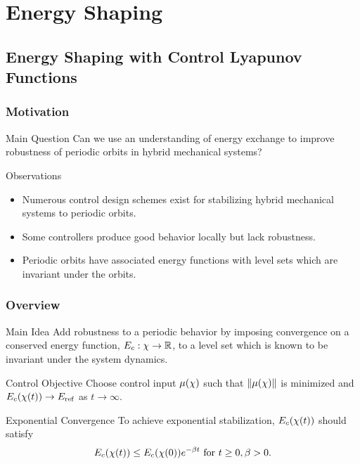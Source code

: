 \section{Energy Shaping}
\showtoc

\subsection{Energy Shaping with Control Lyapunov Functions}

\begin{frame}[t]
  \frametitle{Motivation}
  \begin{block}{Main Question}
    Can we use an understanding of energy exchange to improve robustness  of
    periodic orbits in hybrid mechanical systems?
  \end{block}

  \begin{block}{Observations}
    \begin{itemize}
    \item Numerous control design schemes exist for stabilizing hybrid mechanical
      systems to periodic orbits.
    \item Some controllers produce good behavior locally but lack robustness.
    \item Periodic orbits have associated energy functions with level sets which
      are invariant under the orbits.
    \end{itemize}
  \end{block}
\end{frame}

\begin{frame}[t]
  \frametitle{Overview}
  \begin{block}{Main Idea}
    Add robustness to a periodic behavior by imposing convergence on a conserved
    energy function, $E_{c} : \chi \to \mathbb{R}$, to a level set which is known to be
    invariant under the system dynamics.
  \end{block}
  
  \begin{block}{Control Objective}
    Choose control input $\mu(\chi)$ such that $\| \mu(\chi) \|$ is minimized and
    $E_{c}(\chi(t)) \to E_{\mathrm{ref}}$ as $t \to \infty$.
  \end{block}

  \begin{block}{Exponential Convergence}
    To achieve exponential stabilization, $E_{c}(\chi(t))$ should satisfy\vspace{-.4em}
    \begin{align*}
      E_{c}(\chi(t)) \leq E_{c}(\chi(0)) e^{-\beta t} \mbox{ for } t \geq 0, \beta > 0.
    \end{align*}
  \end{block}
\end{frame}


